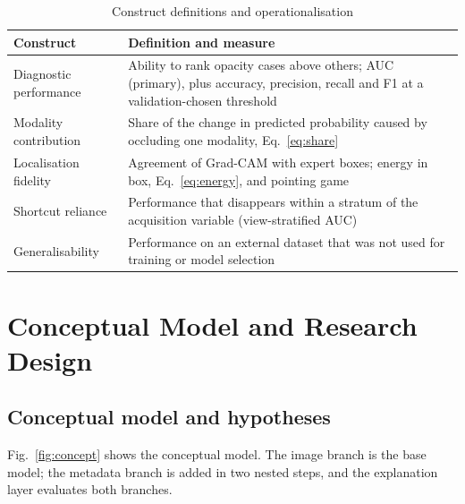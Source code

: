 \documentclass[conference]{IEEEtran}
\begin{document}
\begin{table}[!t]
\caption{Construct definitions and operationalisation}
\label{tab:constructs}
\centering
\footnotesize
\begin{tabular}{@{}p{2.0cm}p{5.9cm}@{}}
\toprule
Construct & Definition and measure \\
\midrule
Diagnostic performance & Ability to rank opacity cases above others; AUC (primary), plus accuracy, precision, recall and F1 at a validation-chosen threshold \\
Modality contribution & Share of the change in predicted probability caused by occluding one modality, Eq.~\eqref{eq:share} \\
Localisation fidelity & Agreement of Grad-CAM with expert boxes; energy in box, Eq.~\eqref{eq:energy}, and pointing game \\
Shortcut reliance & Performance that disappears within a stratum of the acquisition variable (view-stratified AUC) \\
Generalisability & Performance on an external dataset that was not used for training or model selection \\
\bottomrule
\end{tabular}
\end{table}

\section{Conceptual Model and Research Design}
\label{sec:design}

\subsection{Conceptual model and hypotheses}
Fig.~\ref{fig:concept} shows the conceptual model. The image branch is the base model; the metadata branch is added in two nested steps, and the explanation layer evaluates both branches.
\end{document}
